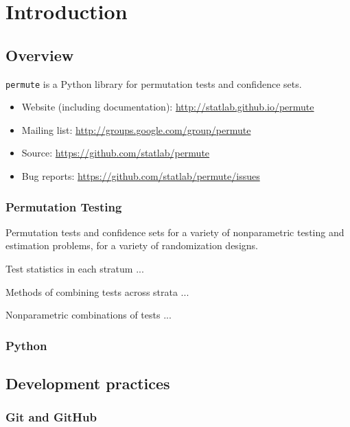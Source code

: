 \chapter{Introduction}

\section{Overview}

\texttt{permute} is a Python library for permutation tests and confidence sets.

\begin{itemize}
\item Website (including documentation): \url{http://statlab.github.io/permute}
\item Mailing list: \url{http://groups.google.com/group/permute}
\item Source: \url{https://github.com/statlab/permute}
\item Bug reports: \url{https://github.com/statlab/permute/issues}
\end{itemize}

\subsection{Permutation Testing}

Permutation tests and confidence sets for a variety of nonparametric testing
and estimation problems, for a variety of randomization designs.
   
Test statistics in each stratum ...

Methods of combining tests across strata ...

Nonparametric combinations of tests ...

\subsection{Python}

\cite{millman2011python, Perez2011}

\section{Development practices}

\cite{millman2014}

\subsection{Git and GitHub}

